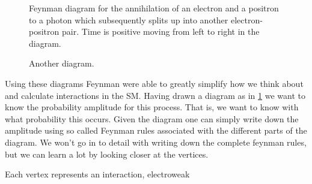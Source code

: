 \begin{figure}[htp]
\centering
	
\caption{Feynman diagram for the annihilation of an electron and a positron to a photon which subsequently splits up into another electron-positron pair. Time is positive moving from left to right in the diagram.} \label{fig:feynmandiagram}
\end{figure}

\begin{figure}[htp]
\centering
	
\caption{Another diagram.}
\end{figure}

Using these diagrams Feynman were able to greatly simplify how we think about and calculate interactions in the SM. Having drawn a diagram as in \ref{fig:feynmandiagram} we want to know the probability amplitude for this process. That is, we want to know with what probability this occurs. Given the diagram one can simply write down the amplitude using so called Feynman rules associated with the different parts of the diagram. We won't go in to detail with writing down the complete feynman rules, but we can learn a lot by looking closer at the vertices.

Each vertex represents an interaction, electroweak
